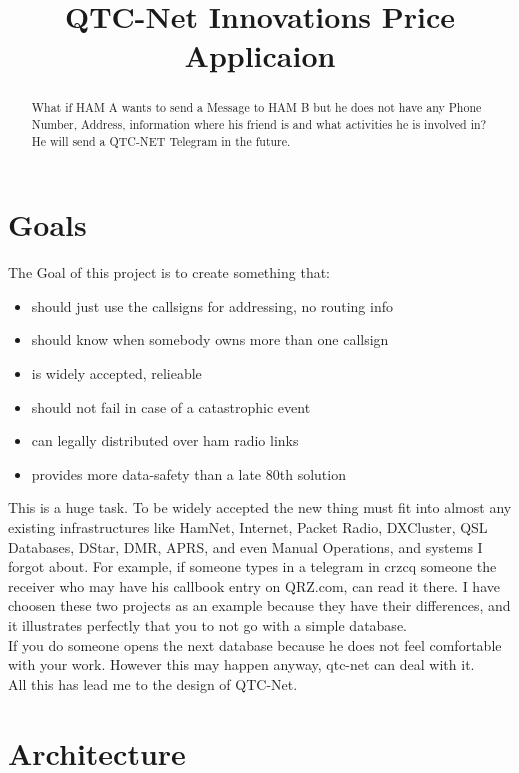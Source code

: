 \documentclass{article}
\title{QTC-Net Innovations Price Applicaion}
\begin{document}
\maketitle


\begin{abstract}
What if HAM A wants to send a Message to HAM B but he does not have any 
Phone Number, Address, information where his friend is and what activities 
he is involved in? He will send a QTC-NET Telegram in the future. 
\end{abstract}

\section{Goals}

The Goal of this project is to create something that:

\begin{itemize}
	\item should just use the callsigns for addressing, no routing info 
	\item should know when somebody owns more than one callsign
	\item is widely accepted, relieable
	\item should not fail in case of a catastrophic event
	\item can legally distributed over ham radio links
	\item provides more data-safety than a late 80th solution
\end{itemize}

This is a huge task. To be widely accepted the new thing must fit into almost 
any existing infrastructures like HamNet, Internet, Packet Radio, DXCluster, 
QSL Databases, DStar, DMR, APRS, and even Manual Operations, and systems I 
forgot about. For example, if someone types in a telegram in crzcq someone 
the receiver who may have his callbook entry on QRZ.com, can read it there. 
I have choosen these two projects as an example because they have their 
differences, and it illustrates perfectly that you to not go with a simple 
database. \\

If you do someone opens the next database because he does not feel 
comfortable with your work. However this may happen anyway, qtc-net can deal 
with it. \\

All this has lead me to the design of QTC-Net.  


\section{Architecture}
\end{document}
